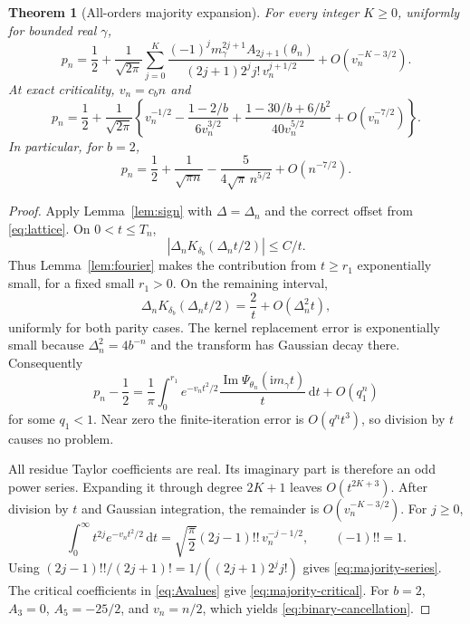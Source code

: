 \documentclass[11pt]{article}
\newtheorem{theorem}{Theorem}[section]
\theoremstyle{definition}
\newcommand{\dd}{\,\mathrm d}
\newcommand{\ii}{\mathrm i}
\begin{document}
\begin{theorem}[All-orders majority expansion]\label{thm:majority}
For every integer $K\geq0$, uniformly for bounded real $\gamma$,
\begin{equation}\label{eq:majority-series}
 p_n=\frac12+\frac1{\sqrt{2\pi}}
      \sum_{j=0}^{K}
       \frac{(-1)^j m_\gamma^{2j+1}A_{2j+1}(\theta_n)}
            {(2j+1)2^j j!\,v_n^{j+1/2}}
       +O(v_n^{-K-3/2}).
\end{equation}
At exact criticality, $v_n=c_bn$ and
\begin{equation}\label{eq:majority-critical}
 p_n=\frac12+\frac1{\sqrt{2\pi}}
 \left\{v_n^{-1/2}
   -\frac{1-2/b}{6v_n^{3/2}}
   +\frac{1-30/b+6/b^2}{40v_n^{5/2}}
   +O(v_n^{-7/2})\right\}.
\end{equation}
In particular, for $b=2$,
\begin{equation}\label{eq:binary-cancellation}
 p_n=\frac12+\frac1{\sqrt{\pi n}}
                   -\frac5{4\sqrt\pi\,n^{5/2}}+O(n^{-7/2}).
\end{equation}
\end{theorem}

\begin{proof}
Apply Lemma~\ref{lem:sign} with $\Delta=\Delta_n$ and the correct
offset from \eqref{eq:lattice}. On $0<t\leq T_n$,
\[
 |\Delta_n K_{\delta_b}(\Delta_nt/2)|\leq C/t.
\]
Thus Lemma~\ref{lem:fourier} makes the contribution from $t\geq r_1$
exponentially small, for a fixed small $r_1>0$. On the remaining
interval,
\[
 \Delta_n K_{\delta_b}(\Delta_nt/2)=\frac2t+O(\Delta_n^2t),
\]
uniformly for both parity cases. The kernel replacement error is
exponentially small because $\Delta_n^2=4b^{-n}$ and the transform
has Gaussian decay there. Consequently
\[
 p_n-\frac12=\frac1\pi\int_0^{r_1}
       e^{-v_nt^2/2}\frac{\operatorname{Im}
                 \Psi_{\theta_n}(\ii m_\gamma t)}t\dd t
                      +O(q_1^n)
\]
for some $q_1<1$. Near zero the finite-iteration error is
$O(q^n t^3)$, so division by $t$ causes no problem.

All residue Taylor coefficients are real. Its imaginary part is
therefore an odd power series. Expanding it through degree $2K+1$
leaves $O(t^{2K+3})$. After division by $t$ and Gaussian integration,
the remainder is $O(v_n^{-K-3/2})$. For $j\geq0$,
\[
 \int_0^\infty t^{2j}e^{-v_nt^2/2}\dd t
       =\sqrt{\frac\pi2}(2j-1)!!\,v_n^{-j-1/2},
 \qquad (-1)!!=1.
\]
Using
$(2j-1)!!/(2j+1)!=1/((2j+1)2^j j!)$
gives \eqref{eq:majority-series}. The critical coefficients in
\eqref{eq:Avalues} give \eqref{eq:majority-critical}. For $b=2$,
$A_3=0$, $A_5=-25/2$, and $v_n=n/2$, which yields
\eqref{eq:binary-cancellation}.
\end{proof}
\end{document}
